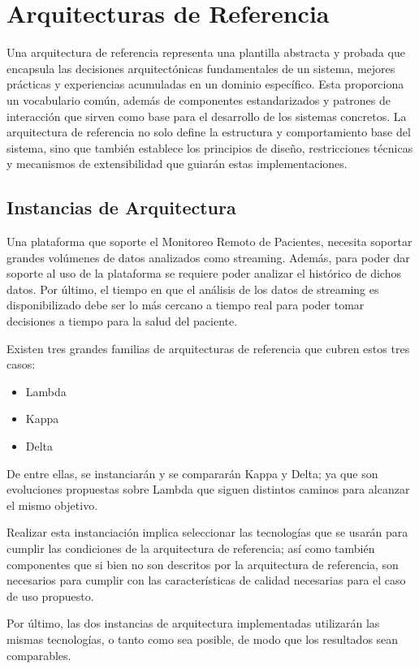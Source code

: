 \section{Arquitecturas de Referencia}

Una arquitectura de referencia representa una plantilla abstracta y probada que encapsula las decisiones arquitectónicas fundamentales de un sistema, 
mejores prácticas y experiencias acumuladas en un dominio específico. 
Esta proporciona un vocabulario común, además de componentes estandarizados y patrones de interacción que sirven como base para el desarrollo de los sistemas concretos. 
La arquitectura de referencia no solo define la estructura y comportamiento base del sistema, sino que también establece los principios de diseño, 
restricciones técnicas y mecanismos de extensibilidad que guiarán estas implementaciones.

\subsection{Instancias de Arquitectura}

Una plataforma que soporte el Monitoreo Remoto de Pacientes, necesita soportar grandes volúmenes de datos analizados como streaming.
Además, para poder dar soporte al uso de la plataforma se requiere poder analizar el histórico de dichos datos. 
Por último, el tiempo en que el análisis de los datos de streaming es disponibilizado debe ser lo más cercano a tiempo real para poder tomar 
decisiones a tiempo para la salud del paciente. 

Existen tres grandes familias de arquitecturas de referencia que cubren estos tres casos: 
\begin{itemize}
    \item Lambda
    \item Kappa
    \item Delta
\end{itemize}

De entre ellas, se instanciarán y se compararán Kappa y Delta; ya que son evoluciones propuestas sobre Lambda que siguen distintos caminos para alcanzar el mismo objetivo.
 
Realizar esta instanciación implica seleccionar las tecnologías que se usarán para cumplir las condiciones de la arquitectura de referencia; 
así como también componentes que si bien no son descritos por la arquitectura de referencia, son necesarios para cumplir con las características de calidad
necesarias para el caso de uso propuesto.

Por último, las dos instancias de arquitectura implementadas utilizarán las mismas tecnologías, o tanto como sea posible, de modo que los resultados sean comparables.  
\newpage